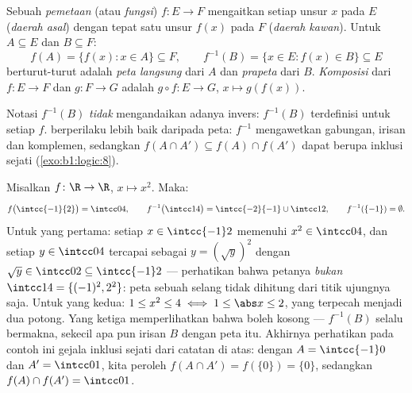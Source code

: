 \begin{definition}\label{def:b1:logic:map}
Sebuah \emph{pemetaan} (atau \emph{fungsi})
$f \colon E \to F$ mengaitkan setiap unsur $x$ pada  $E$
(\emph{daerah asal}) dengan tepat satu unsur $f(x)$ pada  $F$
(\emph{daerah kawan}). Untuk $A
\subseteq E$ dan $B \subseteq F$:
\[
f(A) = \{f(x) : x \in A\} \subseteq F,
\qquad
f^{-1}(B) = \{x \in E : f(x) \in B\} \subseteq E
\]
berturut-turut adalah \emph{peta langsung} dari $A$ dan \emph{prapeta}
 dari $B$. \emph{Komposisi} dari $f \colon E \to F$
dan $g \colon F \to G$ adalah $g \circ f \colon E \to G$, $x \mapsto
g(f(x))$.
\end{definition}

\begin{remark}
Notasi $f^{-1}(B)$ \emph{tidak} mengandaikan adanya  invers:
$f^{-1}(B)$ terdefinisi untuk setiap $f$.  berperilaku lebih
baik daripada peta: $f^{-1}$ mengawetkan gabungan, irisan dan
komplemen, sedangkan $f(A \cap A') \subseteq f(A) \cap f(A')$ dapat
berupa inklusi sejati (\cref{exo:b1:logic:8}).
\end{remark}

\begin{example}\label{ex:b1:logic:images}
Misalkan $f \colon \R \to \R$, $x \mapsto x^2$. Maka:
\[
f\bigl(\intcc{-1}{2}\bigr) = \intcc04, \qquad
f^{-1}\bigl(\intcc14\bigr) = \intcc{-2}{-1} \cup \intcc12, \qquad
f^{-1}(\{-1\}) = \emptyset .
\]
Untuk yang pertama: setiap $x \in \intcc{-1}2$ memenuhi
$x^2 \in \intcc04$, dan setiap $y \in \intcc04$ tercapai sebagai
$y = (\sqrt y)^2$ dengan $\sqrt y
\in \intcc02 \subseteq \intcc{-1}2$ --- perhatikan bahwa petanya
\emph{bukan} $\intcc14 = \{(-1)^2, 2^2\}$: peta sebuah selang tidak
dihitung dari titik ujungnya saja. Untuk yang kedua:
$1 \leq x^2 \leq 4 \iff
1 \leq \abs x \leq 2$, yang terpecah menjadi dua potong. Yang ketiga
memperlihatkan bahwa  boleh kosong --- $f^{-1}(B)$ selalu
bermakna, sekecil apa pun irisan $B$ dengan peta itu. Akhirnya
perhatikan pada contoh ini gejala inklusi sejati dari catatan di atas:
dengan $A = \intcc{-1}0$ dan $A' = \intcc01$, kita peroleh
$f(A \cap A') = f(\{0\}) = \{0\}$, sedangkan
$f(A) \cap f(A') = \intcc01$.
\end{example}

